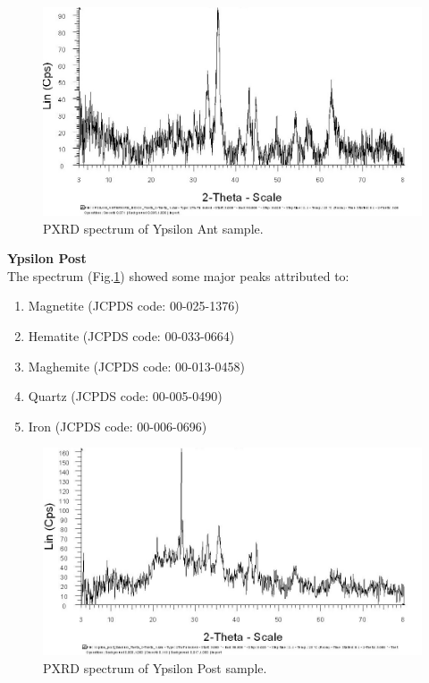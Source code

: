\begin{figure}[H]
\centering
    \includegraphics[scale=0.46]{images/YPSILON_ANT_DISCO.jpg}
    \caption{PXRD spectrum of Ypsilon Ant sample.}
    \label{fig:Ypsilon_Ant_PXRD}
\end{figure} 

\textbf{Ypsilon Post} \\
The spectrum (Fig.\ref{fig:Ypsilon_Ant_PXRD}) showed some major peaks attributed to:

\begin{enumerate}[noitemsep]
    \item Magnetite (JCPDS code: 00-025-1376)
    \item Hematite (JCPDS code: 00-033-0664)
    \item Maghemite (JCPDS code: 00-013-0458)
    \item Quartz (JCPDS code: 00-005-0490)
    \item Iron (JCPDS code: 00-006-0696)
\end{enumerate}

\begin{figure}[H]
\centering
    \includegraphics[scale=0.46]{images/YPSILON_POST_TAMBURO.jpg}
    \caption{PXRD spectrum of Ypsilon Post sample.}
    \label{fig:Ypsilon_Post_PXRD}
\end{figure} 


